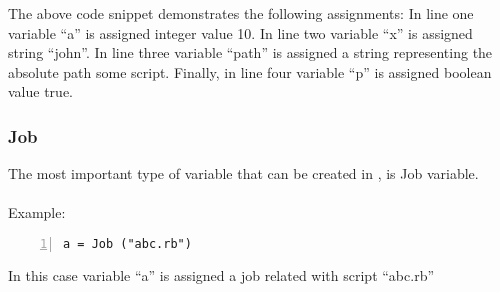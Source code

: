 The above code snippet demonstrates the following assignments:
In line one variable ``a'' is assigned integer value 10.
In line two variable ``x'' is assigned string ``john''.
In line three variable ``path'' is assigned a string representing the absolute path some script.
Finally, in line four variable ``p'' is assigned boolean value true.

\subsubsection*{Job}
The most important type of variable that can be created in \lang{}, is Job variable.\\
\\
Example:
\begin{Verbatim}[numbers=left]
a = Job ("abc.rb")
\end{Verbatim}
In this case variable ``a'' is assigned a job related with script ``abc.rb'' 

